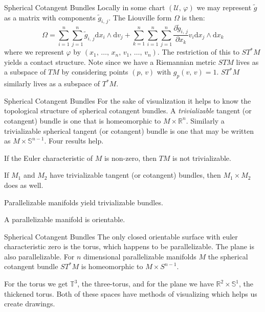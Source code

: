 \documentclass{beamer}
\begin{document}
    \begin{frame}{Spherical Cotangent Bundles}
        Locally in some chart $(\mathcal{U},\,\varphi)$ we may represent
        $\tilde{g}$ as a matrix with components $\tilde{g}_{i,\,j}$. The
        Liouville form $\Omega$ is then:
        \begin{equation}
            \Omega=\sum_{i=1}^{n}\sum_{j=1}^{n}
                \tilde{g}_{i,\,j}\textrm{d}x_{i}\land\textrm{d}v_{j}+
            \sum_{k=1}^{n}\sum_{i=1}^{n}\sum_{j=1}^{n}
                \frac{\partial\tilde{g}_{i,\,j}}{\partial{x}_{k}}
                v_{i}\textrm{d}x_{j}\land\textrm{d}x_{k}
        \end{equation}
        where we represent $\varphi$ by
        $(x_{1},\,\dots,\,x_{n},\,v_{1},\,\dots,\,v_{n})$. The restriction of
        this to $ST^{*}M$ yields a contact structure. Note since we have a
        Riemannian metric $STM$ lives as a subspace of $TM$ by
        considering points $(p,\,v)$ with $g_{p}(v,\,v)=1$. $ST^{*}M$ similarly
        lives as a subspace of $T^{*}M$.
    \end{frame}
    \begin{frame}{Spherical Cotangent Bundles}
        For the sake of visualization it helps to know the topological
        structure of spherical cotangent bundles. A \textit{trivializable}
        tangent (or cotangent) bundle is one that is homeomorphic to
        $M\times\mathbb{R}^{n}$. Similarly a trivializable spherical tangent
        (or cotangent) bundle is one that may be written as
        $M\times\mathbb{S}^{n-1}$. Four results help.
        \begin{theorem}
            If the Euler characteristic of $M$ is non-zero, then $TM$ is not
            trivializable.
        \end{theorem}
        \begin{theorem}
            If $M_{1}$ and $M_{2}$ have trivializable tangent (or cotangent)
            bundles, then $M_{1}\times{M}_{2}$ does as well.
        \end{theorem}
        \begin{theorem}
            Parallelizable manifolds yield trivializable bundles.
        \end{theorem}
        \begin{theorem}
            A parallelizable manifold is orientable.
        \end{theorem}
    \end{frame}
    \begin{frame}{Spherical Cotangent Bundles}
        The only closed orientable surface with euler characteristic zero is
        the torus, which happens to be parallelizable. The plane is also
        parallelizable. For $n$ dimensional parallelizable manifolds $M$ the
        spherical cotangent bundle $ST^{*}M$ is homeomorphic to
        $M\times{S}^{n-1}$.
        \par\hfill\par
        For the torus we get $\mathbb{T}^{3}$, the
        three-torus, and for the plane we have
        $\mathbb{R}^{2}\times\mathbb{S}^{1}$, the thickened torus. Both of these
        spaces have methods of visualizing which helps us create drawings.
    \end{frame}
\end{document}

